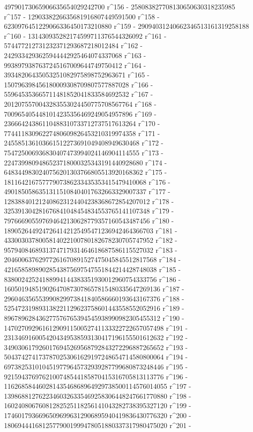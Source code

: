        49790173065906635654029242700 r^156 - 
       258083827708130650630318235985 r^157 - 
       1290338226635681916807449591500 r^158 - 
       6230976451229066336450173210880 r^159 - 
       29094031240662346513161319258188 r^160 - 
       131430935282174599711376544326092 r^161 - 
       574477212731232371293687218012484 r^162 - 
       2429334293625944442925464074337068 r^163 - 
       9938979387637245167009644749750412 r^164 - 
       39348206435053251082975898752963671 r^165 - 
       150796398456180009308709807577887028 r^166 - 
       559645353665711481852041833584692532 r^167 - 
       2012075570043283553024450775708567764 r^168 - 
       7009654054481014235356469249054957896 r^169 - 
       23666424386110488310733712737517613264 r^170 - 
       77441183096227480609826453210319974358 r^171 - 
       245585136103661512273691049408949630468 r^172 - 
       754725006936830407473994024146904114555 r^173 - 
       2247399809486523718000325343191440928680 r^174 - 
       6483449830240756201303766805513920168362 r^175 - 
       18116421675777907386233435353415479410068 r^176 - 
       49018505863513115108404017632663329007337 r^177 - 
       128388401212408623124404238368672854207012 r^178 - 
       325391304281676841048454834553765141107348 r^179 - 
       797666905597694642130628779357160543487456 r^180 - 
       1890526449247264142125495471236942464366703 r^181 - 
       4330030378005814022100780182678230705747952 r^182 - 
       9579408468931374717931464618687586115527032 r^183 - 
       20460063762977261670891527475045845512817568 r^184 - 
       42165858989028543875697547551844214428748038 r^185 - 
       83800242524188994144383351930012960754333756 r^186 - 
       160501948519026470873078657815480335647269136 r^187 - 
       296046356553990829973841840586660193643167376 r^188 - 
       525472319893138221129623758601443558552052916 r^189 - 
       896789628436277576765394545938990982305455312 r^190 - 
       1470270929616129091150052741133322722657057498 r^191 - 
       2313469160054204349538593130417196155501612632 r^192 - 
       3490306179260176945269568792843272296887265652 r^193 - 
       5043742741737870253061629197248654714580800064 r^194 - 
       6973825310104519779645732939287799680873248446 r^195 - 
       9215943769762100748544185870415316705813113776 r^196 - 
       11626858446028143546868964929738500114576014055 r^197 - 
       13986881276223460326335469258306448247661770880 r^198 - 
       16024080676081282525118256141043282738395327120 r^199 - 
       17460179366965096996312906895940419836430776320 r^200 - 
       18069444168125779001999478051880337317980475020 r^201 - 
